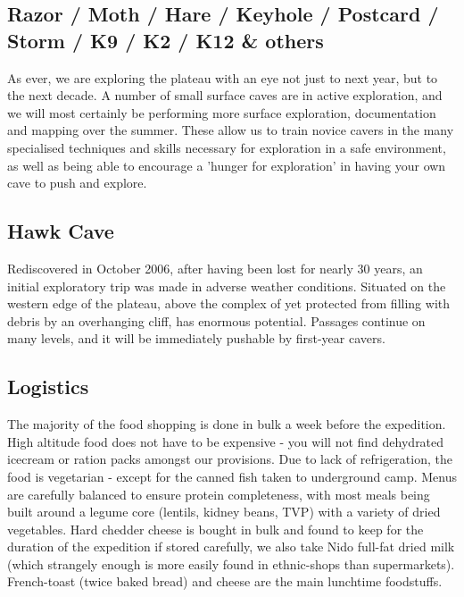 \subsection{Razor / Moth / Hare / Keyhole / Postcard / Storm / K9 / K2 / K12 \& others}

As ever, we are exploring the plateau with an eye not just to next year, but to the next decade. A number of small surface caves are in active exploration, and we will most certainly be performing more surface exploration, documentation and mapping over the summer. These allow us to train novice cavers in the many specialised techniques and skills necessary for exploration in a safe environment, as well as being able to encourage a 'hunger for exploration' in having your own cave to push and explore.

\subsection{Hawk Cave}

Rediscovered in October 2006, after having been lost for nearly 30 years, an initial exploratory trip was made in adverse weather conditions. Situated on the western edge of the plateau, above the complex of  yet protected from filling with debris by an overhanging cliff,  has enormous potential. Passages continue on many levels, and it will be immediately pushable by first-year cavers.


\subsection{Logistics}

The majority of the food shopping is done in bulk a week before the expedition. High altitude food does not have to be expensive - you will not find dehydrated icecream or ration packs amongst our provisions. Due to lack of refrigeration, the food is vegetarian - except for the canned fish taken to underground camp. Menus are carefully balanced to ensure protein completeness, with most meals being built around a legume core (lentils, kidney beans, TVP) with a variety of dried vegetables. Hard chedder cheese is bought in bulk and found to keep for the duration of the expedition if stored carefully, we also take Nido full-fat dried milk (which strangely enough is more easily found in ethnic-shops than supermarkets). French-toast (twice baked bread) and cheese are the main lunchtime foodstuffs.

